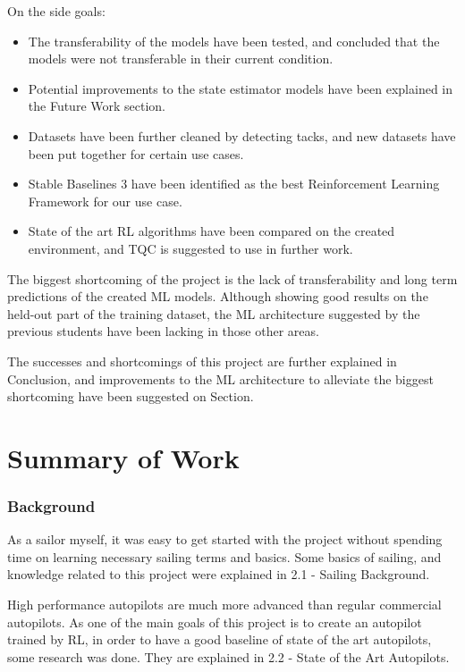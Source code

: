 \documentclass[12pt,twoside]{report}
\begin{document}
\noindent
On the side goals:
\begin{itemize}
    \item The transferability of the models have been tested, and concluded that the models were not transferable in their current condition.
    \item Potential improvements to the state estimator models have been explained in the Future Work section.
    \item Datasets have been further cleaned by detecting tacks, and new datasets have been put together for certain use cases.
    \item Stable Baselines 3 have been identified as the best Reinforcement Learning Framework for our use case.
    \item State of the art RL algorithms have been compared on the created environment, and TQC is suggested to use in further work.
\end{itemize}

The biggest shortcoming of the project is the lack of transferability and long term predictions of the created ML models. Although showing good results on the held-out part of the training dataset, the ML architecture suggested by the previous students have been lacking in those other areas. 

The successes and shortcomings of this project are further explained in Conclusion, and improvements to the ML architecture to alleviate the biggest shortcoming have been suggested on  Section.

\section{Summary of Work}

\subsubsection{Background}
As a sailor myself, it was easy to get started with the project without spending time on learning necessary sailing terms and basics. Some basics of sailing, and knowledge related to this project were explained in 2.1 - Sailing Background. 

High performance autopilots are much more advanced than regular commercial autopilots. As one of the main goals of this project is to create an autopilot trained by RL, in order to have a good baseline of state of the art autopilots, some research was done. They are explained in 2.2 - State of the Art Autopilots.
\end{document}
